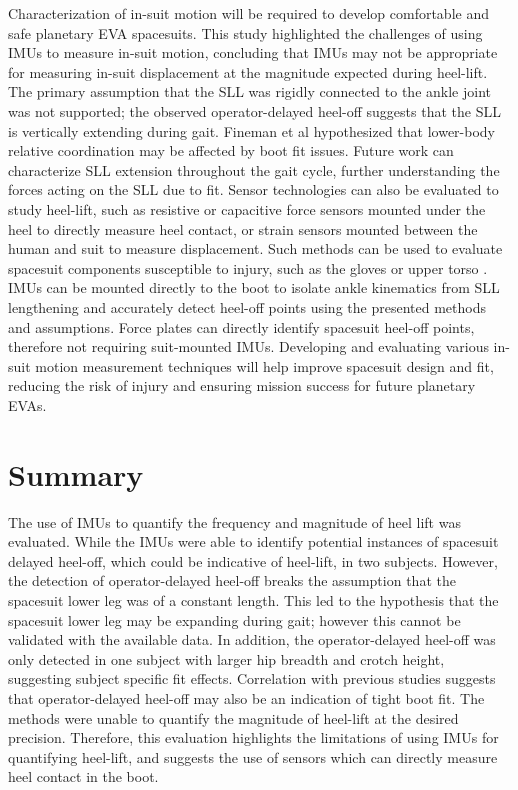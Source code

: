 \documentclass[defaultstyle,11pt]{thesis}
\begin{document}
Characterization of in-suit motion will be required to develop comfortable and safe planetary EVA spacesuits.
This study highlighted the challenges of using IMUs to measure in-suit motion, concluding that IMUs may not be appropriate for measuring in-suit displacement at the magnitude expected during heel-lift.
The primary assumption that the SLL was rigidly connected to the ankle joint was not supported; the observed operator-delayed heel-off suggests that the SLL is vertically extending during gait.
Fineman et al \citep{Fineman2018} hypothesized that lower-body relative coordination may be affected by boot fit issues.
Future work can characterize SLL extension throughout the gait cycle, further understanding the forces acting on the SLL due to fit.
Sensor technologies can also be evaluated to study heel-lift, such as resistive or capacitive force sensors mounted under the heel to directly measure heel contact, or strain sensors mounted between the human and suit to measure displacement.
Such methods can be used to evaluate spacesuit components susceptible to injury, such as the gloves or upper torso \citep{Chappell2017}.
IMUs can be mounted directly to the boot to isolate ankle kinematics from SLL lengthening and accurately detect heel-off points using the presented methods and assumptions.
Force plates can directly identify spacesuit heel-off points, therefore not requiring suit-mounted IMUs.
Developing and evaluating various in-suit motion measurement techniques will help improve spacesuit design and fit, reducing the risk of injury and ensuring mission success for future planetary EVAs.

\hypertarget{summary-2}{%
\section{Summary}\label{summary-2}}

The use of IMUs to quantify the frequency and magnitude of heel lift was evaluated.
While the IMUs were able to identify potential instances of spacesuit delayed heel-off, which could be indicative of heel-lift, in two subjects.
However, the detection of operator-delayed heel-off breaks the assumption that the spacesuit lower leg was of a constant length.
This led to the hypothesis that the spacesuit lower leg may be expanding during gait; however this cannot be validated with the available data.
In addition, the operator-delayed heel-off was only detected in one subject with larger hip breadth and crotch height, suggesting subject specific fit effects.
Correlation with previous studies suggests that operator-delayed heel-off may also be an indication of tight boot fit.
The methods were unable to quantify the magnitude of heel-lift at the desired precision.
Therefore, this evaluation highlights the limitations of using IMUs for quantifying heel-lift, and suggests the use of sensors which can directly measure heel contact in the boot.
\end{document}
